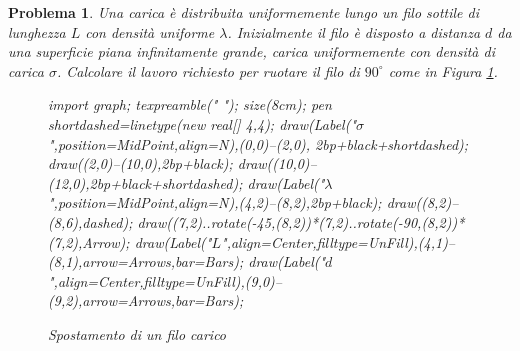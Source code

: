 \documentclass[a4paper,oneside]{article}
\newtheorem{problema}{Problema}
\let\oldhat\hat
\renewcommand{\vec}[1]{\mathbf{#1}}
\renewcommand{\hat}[1]{\widehat{\mathbf{#1}}}
\begin{document}
\begin{problema}
	Una carica è distribuita uniformemente lungo un filo sottile di lunghezza
	$L$ con densità uniforme $\lambda$. Inizialmente il filo è disposto a distanza
	$d$ da una superficie piana infinitamente grande, carica uniformemente con
	densità di carica $\sigma$. Calcolare il lavoro richiesto per ruotare il filo di
	$90^{\circ}$ come in Figura \ref{fig:spostamento_filo}.
	\begin{figure}
		\centering
		\begin{asy}
			import graph;
			texpreamble("\let\oldhat\hat
			\renewcommand{\vec}[1]{\mathbf{#1}}
			\renewcommand{\hat}[1]{\oldhat{\mathbf{#1}}}");
			size(8cm);
			pen shortdashed=linetype(new real[] {4,4});
			draw(Label("$\sigma$",position=MidPoint,align=N),(0,0)--(2,0),
			2bp+black+shortdashed);
			draw((2,0)--(10,0),2bp+black);
			draw((10,0)--(12,0),2bp+black+shortdashed);
			draw(Label("$\lambda$",position=MidPoint,align=N),(4,2)--(8,2),2bp+black);
			draw((8,2)--(8,6),dashed);
			draw((7,2)..rotate(-45,(8,2))*(7,2)..rotate(-90,(8,2))*(7,2),Arrow);
			draw(Label("$L$",align=Center,filltype=UnFill),(4,1)--(8,1),arrow=Arrows,bar=Bars);
			draw(Label("$d$",align=Center,filltype=UnFill),(9,0)--(9,2),arrow=Arrows,bar=Bars);
		\end{asy}
		\caption{Spostamento di un filo carico}
		\label{fig:spostamento_filo}
	\end{figure}
\end{problema}
\end{document}
